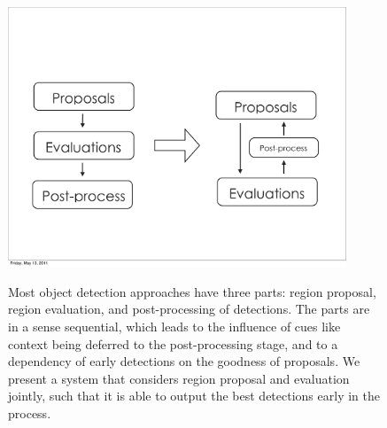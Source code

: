 \begin{figure}[h!]
  \caption{Most object detection approaches have three parts: region proposal, region evaluation, and post-processing of detections. The parts are in a sense sequential, which leads to the influence of cues like context being deferred to the post-processing stage, and to a dependency of early detections on the goodness of proposals. We present a system that considers region proposal and evaluation jointly, such that it is able to output the best detections early in the process.}
  \centering
    \includegraphics[width=0.9\textwidth]{../figures/architecture_concept.pdf}
  \label{fig:architecture_concept}
\end{figure}